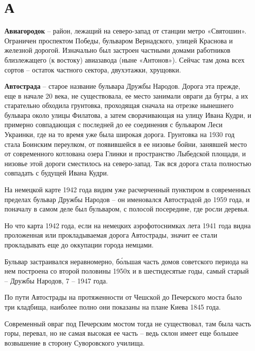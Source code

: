 \chapter*{А}


\textbf{Авиагородок} – район, лежащий на северо-запад от станции метро «Святошин». Ограничен проспектом Победы, бульваром Вернадского, улицей Краснова и железной дорогой. Изначально был застроен частными домами работников близлежащего (к востоку) авиазавода (ныне «Антонов»). Сейчас там дома всех сортов – остаток частного сектора, двухэтажки, хрущовки.\\

\medskip

\textbf{Автострада} – старое название бульвара Дру\-жбы Народов. Дорога эта прежде, еще в начале 20 века, не существовала, ее место занимали овраги да бугры, а их старательно обходила грунтовка, проходящая сначала на отрезке нынешнего бульвара около улицы Филатова, а затем сворачивающая на улицу Ивана Кудри, и примерно совпадающая с последней до ее соединения с бульваром Леси Украинки, где на то время уже была широкая дорога. Грунтовка на 1930 год стала Боинским переулком, от появившейся в ее низовье бойни, занявшей место от современного котлована озера Глинки и пространство Лыбедской площади, и низовье этой дороги сместилось на северо-запад. Так вся дорога стала полностью совпадать с будущей Ивана Кудри.

На немецкой карте 1942 года видим уже расчерченный пунктиром в современных пределах бульвар Дружбы Народов – он именовался Автострадой до 1959 года, и поначалу в самом деле был бульваром, с полосой посередине, где росли деревья.

Но что карта 1942 года, если на немецких аэрофотоснимках лета 1941 года видна проложенная или прокладываемая дорога Автострады, значит ее стали прокладывать еще до оккупации города немцами.

Бульвар застраивался неравномерно, б\'ольшая часть домов советского периода на нем построена со второй половины 1950х и в шестидесятые годы, самый старый – Дружбы Народов, 7 – 1947 года.

По пути Автострады на протяженности от Чешской до Печерского моста было три кладбища, наиболее полно они показаны на плане Киева 1845 года.

Современный овраг под Печерским мостом тогда не существовал, там была часть горы, перевал, но не самая высокая ее часть – ведь склон имеет еще большее возвышение в сторону Суворовского училища.

